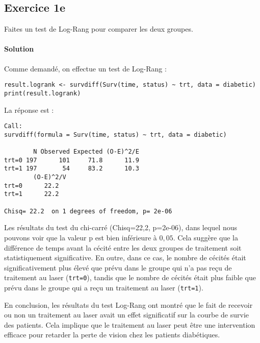 \documentclass[../main.tex]{subfiles}
\begin{document}
\begin{CJK*}{UTF8}{gbsn}

\section*{Exercice 1e}
Faites un test de Log-Rang pour comparer les deux groupes.
    
\paragraph{Solution}

Comme demandé, on effectue un test de Log-Rang :
    
\begin{lstlisting}
result.logrank <- survdiff(Surv(time, status) ~ trt, data = diabetic)
print(result.logrank)
\end{lstlisting}

La réponse est :

\begin{lstlisting}
Call:
survdiff(formula = Surv(time, status) ~ trt, data = diabetic)
    
        N Observed Expected (O-E)^2/E
trt=0 197      101     71.8      11.9
trt=1 197       54     83.2      10.3
        (O-E)^2/V
trt=0      22.2
trt=1      22.2
    
Chisq= 22.2  on 1 degrees of freedom, p= 2e-06 
\end{lstlisting}

Les résultats du test du chi-carré (Chisq=22,2, p=2e-06), 
dans lequel nous pouvons voir que la valeur p est bien inférieure à $0,05$. 
Cela suggère que la différence de temps avant la cécité entre les deux 
groupes de traitement soit statistiquement significative. 
En outre, dans ce cas, le nombre de cécités était significativement 
plus élevé que prévu dans le groupe qui n'a pas reçu de traitement au laser 
(\texttt{trt=0}), tandis que le nombre de cécités était plus faible que prévu 
dans le groupe qui a reçu un traitement au laser (\texttt{trt=1}).
    
En conclusion, les résultats du test Log-Rang ont 
montré que le fait de recevoir ou non un traitement 
au laser avait un effet significatif sur la courbe 
de survie des patients. Cela implique que le 
traitement au laser peut être une intervention 
efficace pour retarder la perte de vision chez les patients diabétiques.

\end{CJK*}
\end{document}
